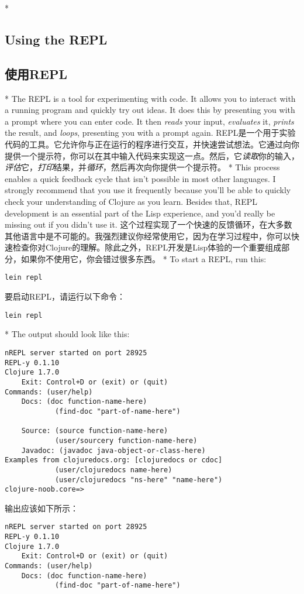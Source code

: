 \begin{paracol}{2}
\switchcolumn[0]*
\subsection{Using the REPL}
\switchcolumn
\subsection{使用REPL}
\switchcolumn[0]*
The REPL is a tool for experimenting with code. It allows you to
interact with a running program and quickly try out ideas. It does this
by presenting you with a prompt where you can enter code. It then
\emph{reads} your input, \emph{evaluates} it, \emph{prints} the result,
and \emph{loops}, presenting you with a prompt again.
\switchcolumn
REPL是一个用于实验代码的工具。它允许你与正在运行的程序进行交互，并快速尝试想法。它通过向你提供一个提示符，你可以在其中输入代码来实现这一点。然后，它\emph{读取}你的输入，\emph{评估}它，\emph{打印}结果，并\emph{循环}，然后再次向你提供一个提示符。
\switchcolumn[0]*
This process enables a quick feedback cycle that isn't possible in most
other languages. I strongly recommend that you use it frequently because
you'll be able to quickly check your understanding of Clojure as you
learn. Besides that, REPL development is an essential part of the Lisp
experience, and you'd really be missing out if you didn't use it.
\switchcolumn
这个过程实现了一个快速的反馈循环，在大多数其他语言中是不可能的。我强烈建议你经常使用它，因为在学习过程中，你可以快速检查你对Clojure的理解。除此之外，REPL开发是Lisp体验的一个重要组成部分，如果你不使用它，你会错过很多东西。
\switchcolumn[0]*
To start a REPL, run this:
\begin{verbatim}
lein repl
\end{verbatim}
\switchcolumn
要启动REPL，请运行以下命令：
\begin{verbatim}
lein repl
\end{verbatim}
\switchcolumn[0]*
The output should look like this:
\begin{verbatim}
nREPL server started on port 28925
REPL-y 0.1.10
Clojure 1.7.0
    Exit: Control+D or (exit) or (quit)
Commands: (user/help)
    Docs: (doc function-name-here)
            (find-doc "part-of-name-here")

    Source: (source function-name-here)
            (user/sourcery function-name-here)
    Javadoc: (javadoc java-object-or-class-here)
Examples from clojuredocs.org: [clojuredocs or cdoc]
            (user/clojuredocs name-here)
            (user/clojuredocs "ns-here" "name-here")
clojure-noob.core=>
\end{verbatim}
\switchcolumn
输出应该如下所示：
\begin{verbatim}
nREPL server started on port 28925
REPL-y 0.1.10
Clojure 1.7.0
    Exit: Control+D or (exit) or (quit)
Commands: (user/help)
    Docs: (doc function-name-here)
            (find-doc "part-of-name-here")


\end{verbatim}
\end{paracol}
